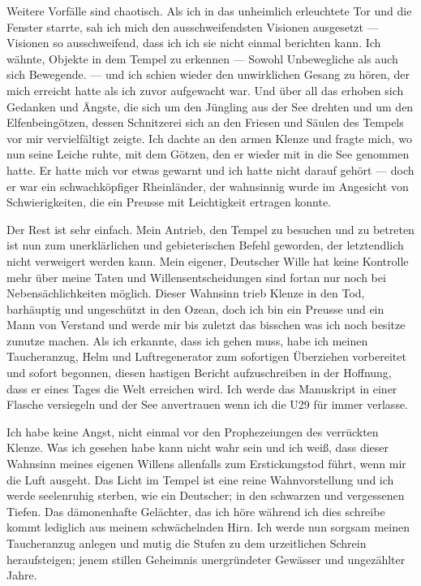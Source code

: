 \documentclass[a4paper]{memoir}
\begin{document}
Weitere Vorfälle sind chaotisch. Als ich in das unheimlich erleuchtete Tor und die Fenster starrte, sah ich mich den ausschweifendsten Visionen ausgesetzt --- Visionen so ausschweifend, dass ich ich sie nicht einmal berichten kann. Ich wähnte, Objekte in dem Tempel zu erkennen --- Sowohl Unbewegliche als auch sich Bewegende. --- und ich schien wieder den unwirklichen Gesang zu hören, der mich erreicht hatte als ich zuvor aufgewacht war. Und über all das erhoben sich Gedanken und Ängste, die sich um den Jüngling aus der See drehten und um den Elfenbeingötzen, dessen Schnitzerei sich an den Friesen und Säulen des Tempels vor mir vervielfältigt zeigte. Ich dachte an den armen Klenze und fragte mich, wo nun seine Leiche ruhte, mit dem Götzen, den er wieder mit in die See genommen hatte. Er hatte mich vor etwas gewarnt und ich hatte nicht darauf gehört --- doch er war ein schwachköpfiger Rheinländer, der wahnsinnig wurde im Angesicht von Schwierigkeiten, die ein Preusse mit Leichtigkeit ertragen konnte.

Der Rest ist sehr einfach. Mein Antrieb, den Tempel zu besuchen und zu betreten ist nun zum unerklärlichen und gebieterischen Befehl geworden, der letztendlich nicht verweigert werden kann. Mein eigener, Deutscher Wille hat keine Kontrolle mehr über meine Taten und Willensentscheidungen sind fortan nur noch bei Nebensächlichkeiten möglich. Dieser Wahnsinn trieb Klenze in den Tod, barhäuptig und ungeschützt in den Ozean, doch ich bin ein Preusse und ein Mann von Verstand und werde mir bis zuletzt das bisschen was ich noch besitze zunutze machen. Als ich erkannte, dass ich gehen muss, habe ich meinen Taucheranzug, Helm und Luftregenerator zum sofortigen Überziehen vorbereitet und sofort begonnen, diesen hastigen Bericht aufzuschreiben in der Hoffnung, dass er eines Tages die Welt erreichen wird. Ich werde das Manuskript in einer Flasche versiegeln und der See anvertrauen wenn ich die U29 für immer verlasse.

Ich habe keine Angst, nicht einmal vor den Prophezeiungen des verrückten Klenze. Was ich gesehen habe kann nicht wahr sein und ich weiß, dass dieser Wahnsinn meines eigenen Willens allenfalls zum Erstickungstod führt, wenn mir die Luft ausgeht. Das Licht im Tempel ist eine reine Wahnvorstellung und ich werde seelenruhig sterben, wie ein Deutscher; in den schwarzen und vergessenen Tiefen. Das dämonenhafte Gelächter, das ich höre während ich dies schreibe kommt lediglich aus meinem schwächelnden Hirn. Ich werde nun sorgsam meinen Taucheranzug anlegen und mutig die Stufen zu dem urzeitlichen Schrein heraufsteigen; jenem stillen Geheimnis unergründeter Gewässer und ungezählter Jahre.
\end{document}
